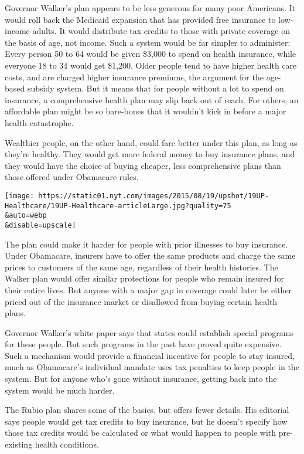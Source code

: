 Governor Walker's plan appears to be less generous for many poor
Americans. It would roll back the Medicaid expansion that has provided
free insurance to low-income adults. It would distribute tax credits to
those with private coverage on the basis of age, not income. Such a
system would be far simpler to administer: Every person 50 to 64 would
be given \$3,000 to spend on health insurance, while everyone 18 to 34
would get \$1,200. Older people tend to have higher health care costs,
and are charged higher insurance premiums, the argument for the
age-based subsidy system. But it means that for people without a lot to
spend on insurance, a comprehensive health plan may slip back out of
reach. For others, an affordable plan might be so bare-bones that it
wouldn't kick in before a major health catastrophe.

Wealthier people, on the other hand, could fare better under this plan,
as long as they're healthy. They would get more federal money to buy
insurance plans, and they would have the choice of buying cheaper, less
comprehensive plans than those offered under Obamacare rules.

\texttt{[image: https://static01.nyt.com/images/2015/08/19/upshot/19UP-Healthcare/19UP-Healthcare-articleLarge.jpg?quality=75\\\&auto=webp\\\&disable=upscale]}

The plan could make it harder for people with prior illnesses to buy
insurance. Under Obamacare, insurers have to offer the same products and
charge the same prices to customers of the same age, regardless of their
health histories. The Walker plan would offer similar protections for
people who remain insured for their entire lives. But anyone with a
major gap in coverage could later be either priced out of the insurance
market or disallowed from buying certain health plans.

Governor Walker's white paper says that states could establish special
programs for these people. But such programs in the past have proved
quite expensive. Such a mechanism would provide a financial incentive
for people to stay insured, much as Obamacare's individual mandate uses
tax penalties to keep people in the system. But for anyone who's gone
without insurance, getting back into the system would be much harder.

The Rubio plan shares some of the basics, but offers fewer details. His
editorial says people would get tax credits to buy insurance, but he
doesn't specify how those tax credits would be calculated or what would
happen to people with pre-existing health conditions.

